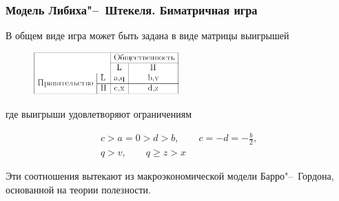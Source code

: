 \documentclass {beamer}
\begin{document}
\begin{frame}
\frametitle{Модель Либиха"--~Штекеля. Биматричная игра}
В общем виде игра может быть задана в виде матрицы выигрышей
\begin{figure}[h!]
	\centering
	\includegraphics[width=0.5\textwidth]{first}
\end{figure}

где выигрыши удовлетворяют ограничениям

\begin{gather}	
\label{eq:sec:ot:constraint}
	c > a = 0 > d > b, \qquad c = -d = -\frac{b}{2}, \\
	q > v, \qquad q \geqslant z > x
\end{gather}

Эти соотношения вытекают из макроэкономической модели Барро"--~Гордона,
основанной на теории полезности.
\end{frame}

%



%  
\end{document}

